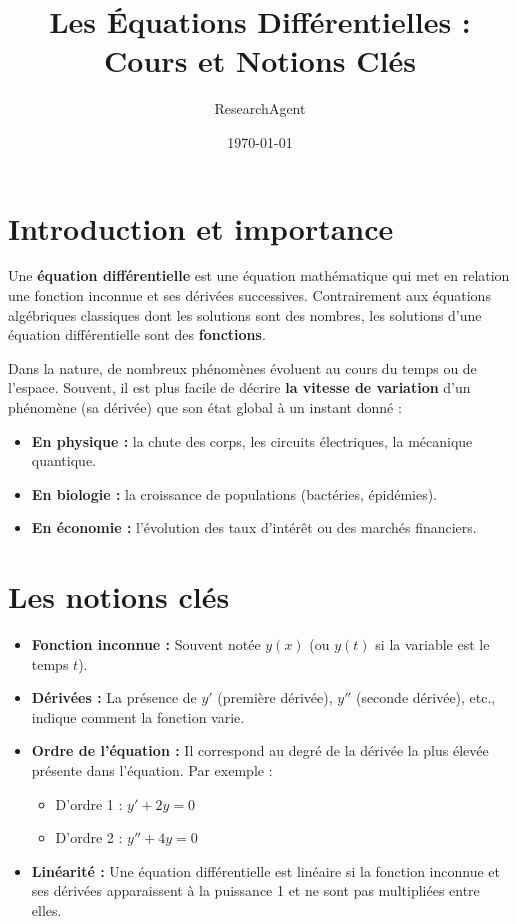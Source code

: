 \documentclass[11pt,a4paper]{article}
\title{Les Équations Différentielles : Cours et Notions Clés}
\author{ResearchAgent}
\date{\today}
\begin{document}
\maketitle

\section{Introduction et importance}
Une \textbf{équation différentielle} est une équation mathématique qui met en relation une fonction inconnue et ses dérivées successives. Contrairement aux équations algébriques classiques dont les solutions sont des nombres, les solutions d'une équation différentielle sont des \textbf{fonctions}.

Dans la nature, de nombreux phénomènes évoluent au cours du temps ou de l'espace. Souvent, il est plus facile de décrire \textbf{la vitesse de variation} d'un phénomène (sa dérivée) que son état global à un instant donné :
\begin{itemize}
    \item \textbf{En physique :} la chute des corps, les circuits électriques, la mécanique quantique.
    \item \textbf{En biologie :} la croissance de populations (bactéries, épidémies).
    \item \textbf{En économie :} l'évolution des taux d'intérêt ou des marchés financiers.
\end{itemize}

\section{Les notions clés}
\begin{itemize}
    \item \textbf{Fonction inconnue :} Souvent notée $y(x)$ (ou $y(t)$ si la variable est le temps $t$).
    \item \textbf{Dérivées :} La présence de $y'$ (première dérivée), $y''$ (seconde dérivée), etc., indique comment la fonction varie.
    \item \textbf{Ordre de l'équation :} Il correspond au degré de la dérivée la plus élevée présente dans l'équation. Par exemple :
    \begin{itemize}
        \item D'ordre 1 : $y' + 2y = 0$
        \item D'ordre 2 : $y'' + 4y = 0$
    \end{itemize}
    \item \textbf{Linéarité :} Une équation différentielle est linéaire si la fonction inconnue et ses dérivées apparaissent à la puissance 1 et ne sont pas multipliées entre elles.
\end{itemize}
\end{document}
